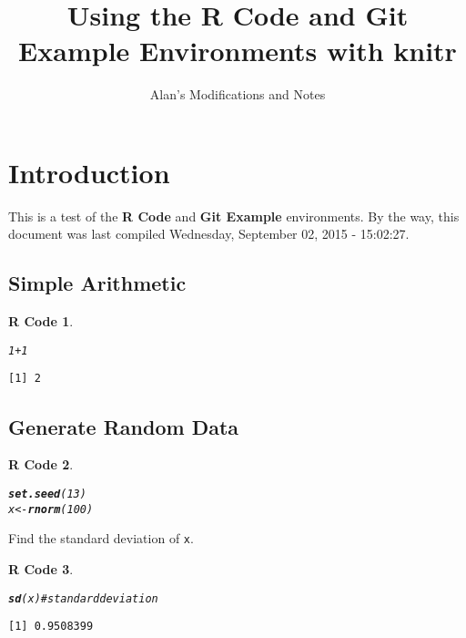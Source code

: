 \documentclass{article}\usepackage[]{graphicx}\usepackage[]{color}
\title{Using the \textbf{R Code} and {\bfseries{Git Example}} Environments with \textbf{knitr}}
\author{Alan's Modifications and Notes}
\makeatletter
\newcommand{\hlnum}[1]{\textcolor[rgb]{0.686,0.059,0.569}{#1}}%
\newcommand{\hlcom}[1]{\textcolor[rgb]{0.678,0.584,0.686}{\textit{#1}}}%
\newcommand{\hlopt}[1]{\textcolor[rgb]{0,0,0}{#1}}%
\newcommand{\hlstd}[1]{\textcolor[rgb]{0.345,0.345,0.345}{#1}}%
\newcommand{\hlkwb}[1]{\textcolor[rgb]{0.69,0.353,0.396}{#1}}%
\newcommand{\hlkwd}[1]{\textcolor[rgb]{0.737,0.353,0.396}{\textbf{#1}}}%
\newenvironment{kframe}{%
 \def\at@end@of@kframe{}%
 \ifinner\ifhmode%
  \def\at@end@of@kframe{\end{minipage}}%
  \begin{minipage}{\columnwidth}%
 \fi\fi%
 \def\FrameCommand##1{\hskip\@totalleftmargin \hskip-\fboxsep
 \colorbox{shadecolor}{##1}\hskip-\fboxsep
     \hskip-\linewidth \hskip-\@totalleftmargin \hskip\columnwidth}%
 \MakeFramed {\advance\hsize-\width
   \@totalleftmargin\z@ \linewidth\hsize
   \@setminipage}}%
 {\par\unskip\endMakeFramed%
 \at@end@of@kframe}
\newenvironment{knitrout}{}{} %
\theoremstyle{rcode}
\newtheorem{rcode}{R Code}[section]
\newcommand{\noind}{\setlength{\parindent}{0pt}}
\makeatother
\begin{document}
\maketitle




\section{Introduction}

This is a test of the \textbf{R Code} and \textbf{Git Example} environments.  By the way,
this document was last compiled Wednesday, September 02, 2015 - 15:02:27.

\subsection{Simple Arithmetic}

\begin{knitrout}
\color{fgcolor}\begin{kframe}
\begin{rcode}\label{test-a}\hfill{}\begin{alltt}
\hlnum{1} \hlopt{+} \hlnum{1}
\end{alltt}
\begin{verbatim}
[1] 2
\end{verbatim}
\end{rcode}\end{kframe}
\end{knitrout}


\subsection{Generate Random Data}

\begin{knitrout}
\color{fgcolor}\begin{kframe}
\begin{rcode}\label{test-b}\hfill{}\begin{alltt}
\hlkwd{set.seed}\hlstd{(}\hlnum{13}\hlstd{)}
\hlstd{x} \hlkwb{<-} \hlkwd{rnorm}\hlstd{(}\hlnum{100}\hlstd{)}
\end{alltt}
\end{rcode}\end{kframe}
\end{knitrout}
\noind
Find the standard deviation of \texttt{x}.

\begin{knitrout}
\color{fgcolor}\begin{kframe}
\begin{rcode}\label{test-c}\hfill{}\begin{alltt}
\hlkwd{sd}\hlstd{(x)} \hlcom{# standard deviation   }
\end{alltt}
\begin{verbatim}
[1] 0.9508399
\end{verbatim}
\end{rcode}\end{kframe}
\end{knitrout}
\end{document}
